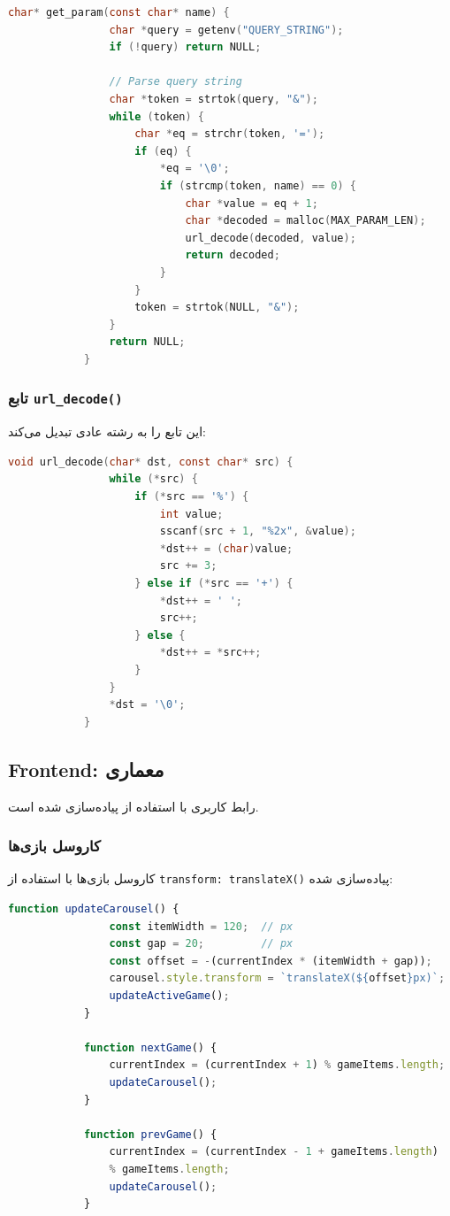 \documentclass[12pt,a4paper]{article}
\begin{document}
	\begin{latin}
		\begin{lstlisting}[language=C, caption=تابع get\_param]
			char* get_param(const char* name) {
				char *query = getenv("QUERY_STRING");
				if (!query) return NULL;
				
				// Parse query string
				char *token = strtok(query, "&");
				while (token) {
					char *eq = strchr(token, '=');
					if (eq) {
						*eq = '\0';
						if (strcmp(token, name) == 0) {
							char *value = eq + 1;
							char *decoded = malloc(MAX_PARAM_LEN);
							url_decode(decoded, value);
							return decoded;
						}
					}
					token = strtok(NULL, "&");
				}
				return NULL;
			}
		\end{lstlisting}
	\end{latin}
	
	\subsubsection{تابع \texttt{url\_decode()}}
	این تابع  را به رشته عادی تبدیل می‌کند:
	
	\begin{latin}
		\begin{lstlisting}[language=C, caption=تابع url\_decode]
			void url_decode(char* dst, const char* src) {
				while (*src) {
					if (*src == '%') {
						int value;
						sscanf(src + 1, "%2x", &value);
						*dst++ = (char)value;
						src += 3;
					} else if (*src == '+') {
						*dst++ = ' ';
						src++;
					} else {
						*dst++ = *src++;
					}
				}
				*dst = '\0';
			}
		\end{lstlisting}
	\end{latin}
	
	\subsection{Frontend: معماری }
	رابط کاربری با استفاده از  پیاده‌سازی شده است.
	
	\subsubsection{کاروسل بازی‌ها}
	کاروسل بازی‌ها با استفاده از \texttt{transform: translateX()} پیاده‌سازی شده:
	
	\begin{latin}
		\begin{lstlisting}[language=JavaScript, caption=کاروسل بازی‌ها]
			function updateCarousel() {
				const itemWidth = 120;  // px
				const gap = 20;         // px
				const offset = -(currentIndex * (itemWidth + gap));
				carousel.style.transform = `translateX(${offset}px)`;
				updateActiveGame();
			}
			
			function nextGame() {
				currentIndex = (currentIndex + 1) % gameItems.length;
				updateCarousel();
			}
			
			function prevGame() {
				currentIndex = (currentIndex - 1 + gameItems.length)
				% gameItems.length;
				updateCarousel();
			}
		\end{lstlisting}
	\end{latin}
	
\end{document}
